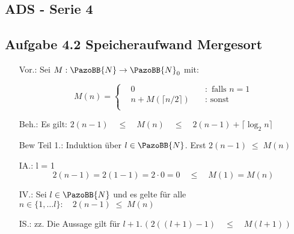 \documentclass[12pt]{article}
\newcommand {\N}{\PazoBB{N}}   %
\begin{document}
\subsection*{ADS - Serie 4}
\subsection*{Aufgabe 4.2 Speicheraufwand Mergesort}
\begin{enumerate}
\item[Vor.:] 
  Sei $M : \N \to \N_0$ mit: 

\[
M(n) = 
\left\{
\begin{array}{lll}
&  0                                              & \quad :  \text{ falls } n = 1                \\ 
& n + M( \lceil n/2 \rceil )             & \quad :  \text{ sonst}     \\
\end{array}
\right.
\]




\item[Beh.:] Es gilt: \quad
$
  2(n-1) \quad \leq           \quad M(n) \quad \leq \quad       2 (n-1) + \lceil \log_2 n \rceil
$


\item[Bew Teil 1.:] Induktion über $l\in\N$. Erst   $2(n-1) \; \leq \; M(n)$
\item[IA.:] l = 1
\[
  2 (n-1) = 2 (1-1) = 2 \cdot 0 = 0 \quad \leq \quad M(1) = M(n)
\]



\item[IV.:]  Sei $l\in \N$ und es gelte für alle $n\in \{ 1, \dots l \}: \quad  2(n-1) \; \leq \; M(n)$



\item[IS.:] zz. Die Aussage gilt für $l+1$.\quad
                      $\big( \;2((l+1)-1) \quad \leq \quad M(l+1) \;\big)$


\end{enumerate}
\end{document}
